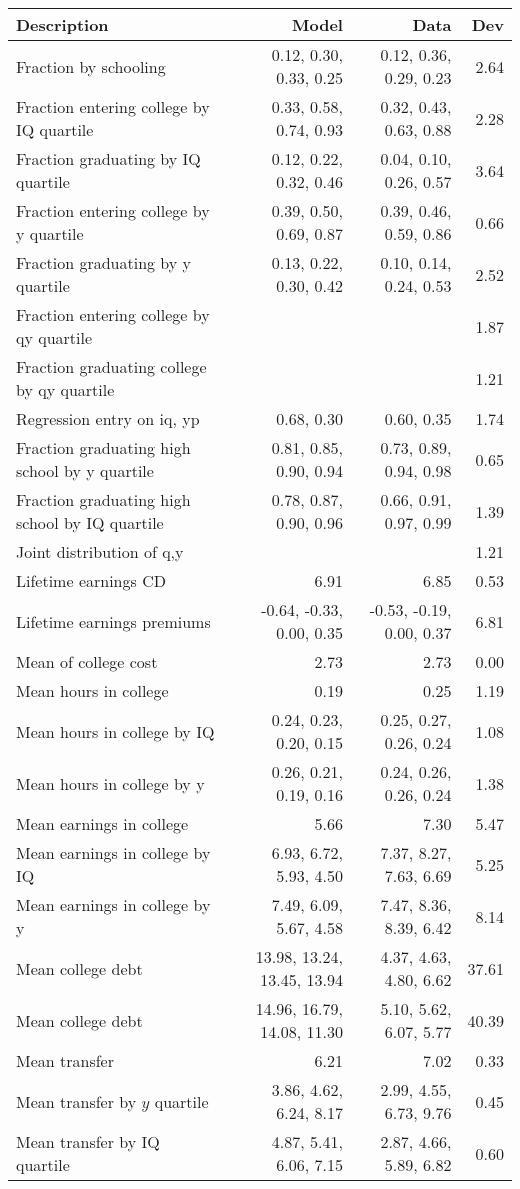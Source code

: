 \begin{tabular}{lrrr}
\hline
Description & Model  & Data  & Dev  \\ 
\hline
Fraction by schooling & 0.12, 0.30, 0.33, 0.25  & 0.12, 0.36, 0.29, 0.23  & 2.64  \\ 
Fraction entering college by IQ quartile & 0.33, 0.58, 0.74, 0.93  & 0.32, 0.43, 0.63, 0.88  & 2.28  \\ 
Fraction graduating by IQ quartile & 0.12, 0.22, 0.32, 0.46  & 0.04, 0.10, 0.26, 0.57  & 3.64  \\ 
Fraction entering college by y quartile & 0.39, 0.50, 0.69, 0.87  & 0.39, 0.46, 0.59, 0.86  & 0.66  \\ 
Fraction graduating by y quartile & 0.13, 0.22, 0.30, 0.42  & 0.10, 0.14, 0.24, 0.53  & 2.52  \\ 
Fraction entering college by qy quartile &   &   & 1.87  \\ 
Fraction graduating college by qy quartile &   &   & 1.21  \\ 
Regression entry on iq, yp & 0.68, 0.30  & 0.60, 0.35  & 1.74  \\ 
Fraction graduating high school by y quartile & 0.81, 0.85, 0.90, 0.94  & 0.73, 0.89, 0.94, 0.98  & 0.65  \\ 
Fraction graduating high school by IQ quartile & 0.78, 0.87, 0.90, 0.96  & 0.66, 0.91, 0.97, 0.99  & 1.39  \\ 
Joint distribution of q,y &   &   & 1.21  \\ 
Lifetime earnings CD & 6.91  & 6.85  & 0.53  \\ 
Lifetime earnings premiums & -0.64, -0.33, 0.00, 0.35  & -0.53, -0.19, 0.00, 0.37  & 6.81  \\ 
Mean of college cost & 2.73  & 2.73  & 0.00  \\ 
Mean hours in college & 0.19  & 0.25  & 1.19  \\ 
Mean hours in college by IQ & 0.24, 0.23, 0.20, 0.15  & 0.25, 0.27, 0.26, 0.24  & 1.08  \\ 
Mean hours in college by y & 0.26, 0.21, 0.19, 0.16  & 0.24, 0.26, 0.26, 0.24  & 1.38  \\ 
Mean earnings in college & 5.66  & 7.30  & 5.47  \\ 
Mean earnings in college by IQ & 6.93, 6.72, 5.93, 4.50  & 7.37, 8.27, 7.63, 6.69  & 5.25  \\ 
Mean earnings in college by y & 7.49, 6.09, 5.67, 4.58  & 7.47, 8.36, 8.39, 6.42  & 8.14  \\ 
Mean college debt & 13.98, 13.24, 13.45, 13.94  & 4.37, 4.63, 4.80, 6.62  & 37.61  \\ 
Mean college debt & 14.96, 16.79, 14.08, 11.30  & 5.10, 5.62, 6.07, 5.77  & 40.39  \\ 
Mean transfer & 6.21  & 7.02  & 0.33  \\ 
Mean transfer by $y$ quartile & 3.86, 4.62, 6.24, 8.17  & 2.99, 4.55, 6.73, 9.76  & 0.45  \\ 
Mean transfer by IQ quartile & 4.87, 5.41, 6.06, 7.15  & 2.87, 4.66, 5.89, 6.82  & 0.60  \\ 
\hline
\end{tabular}%

